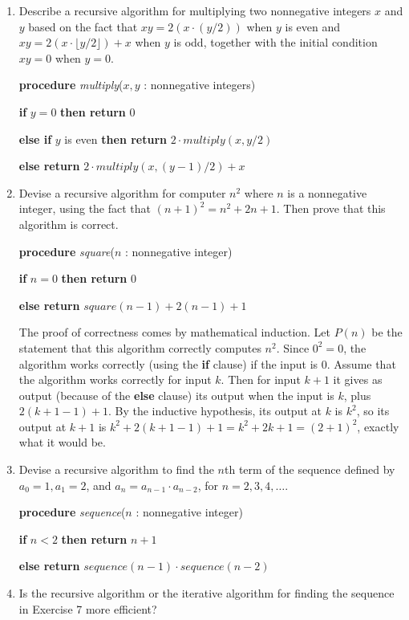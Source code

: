 \documentclass[11pt]{article}
\begin{document}
\begin{enumerate}[label=\textbf{\arabic*.}]
	\item Describe a recursive algorithm for multiplying two nonnegative integers $x$ and $y$ based on the fact that $xy = 2(x \cdot (y / 2))$ when $y$ is even and $xy = 2(x \cdot \lfloor y / 2 \rfloor) + x$ when $y$ is odd, together with the initial condition $xy = 0$ when $y = 0$.
	
	\textbf{procedure} \emph{multiply}($x, y$ : nonnegative integers)
	
	\textbf{if} $y = 0$ \textbf{then return} 0
	
	\textbf{else if} $y$ is even \textbf{then return} $2 \cdot multiply(x, y / 2)$
	
	\textbf{else return} $2 \cdot multiply(x, (y - 1) / 2) + x$
	
	\item Devise a recursive algorithm for computer $n^2$ where $n$ is a nonnegative integer, using the fact that $(n + 1)^2 = n^2 + 2n + 1$. Then prove that this algorithm is correct.
	
	\textbf{procedure} \emph{square}($n$ : nonnegative integer)
	
	\textbf{if} $n = 0$ \textbf{then return} 0
	
	\textbf{else return} $square(n - 1) + 2(n - 1) + 1$
	
	The proof of correctness comes by mathematical induction. Let $P(n)$ be the statement that this algorithm correctly computes $n^2$. Since $0^2 = 0$, the algorithm works correctly (using the \textbf{if} clause) if the input is 0. Assume that the algorithm works correctly for input $k$. Then for input $k + 1$ it gives as output (because of the \textbf{else} clause) its output when the input is $k$, plus $2(k + 1 - 1) + 1$. By the inductive hypothesis, its output at $k$ is $k^2$, so its output at $k + 1$ is $k^2 + 2(k + 1 - 1) + 1 = k^2 + 2k + 1 = (2 + 1)^2$, exactly what it would be.
	
	\item Devise a recursive algorithm to find the $n$th term of the sequence defined by $a_0 = 1, a_1 = 2$, and $a_n = a_{n - 1} \cdot a_{n - 2}$, for $n = 2, 3, 4, \ldots$.
	
	\textbf{procedure} \emph{sequence}($n$ : nonnegative integer)
	
	\textbf{if} $n < 2$ \textbf{then return} $n + 1$
	
	\textbf{else return} $sequence(n - 1) \cdot sequence(n - 2)$
	
	\item Is the recursive algorithm or the iterative algorithm for finding the sequence in Exercise 7 more efficient?
	

\end{enumerate}
\end{document}
